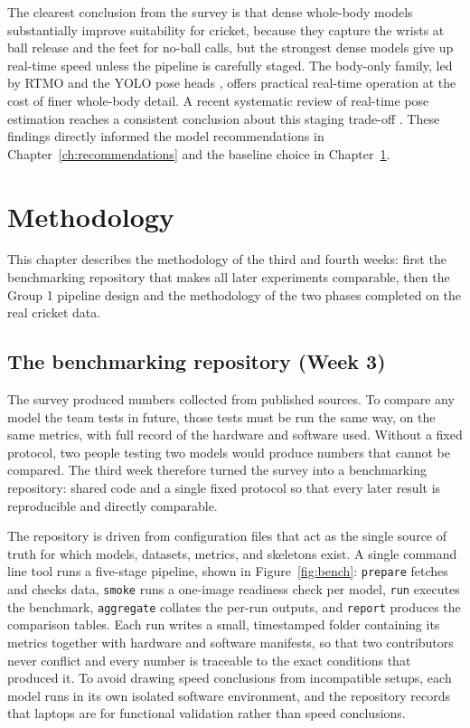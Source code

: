 \documentclass[oneside,openany]{book}
\begin{document}
The clearest conclusion from the survey is that dense whole-body models substantially improve
suitability for cricket, because they capture the wrists at ball release and the feet for
no-ball calls, but the strongest dense models give up real-time speed unless the pipeline is
carefully staged. The body-only family, led by RTMO and the YOLO pose heads
\cite{maji2022yolopose}, offers practical real-time operation at the cost of finer whole-body
detail. A recent systematic review of
real-time pose estimation reaches a consistent conclusion about this staging trade-off
\cite{posereview2025}. These findings directly informed the model recommendations in
Chapter~\ref{ch:recommendations} and the baseline choice in Chapter~\ref{ch:methodology}.

\chapter{Methodology}
\label{ch:methodology}
This chapter describes the methodology of the third and fourth weeks: first the benchmarking
repository that makes all later experiments comparable, then the Group 1 pipeline design and the
methodology of the two phases completed on the real cricket data.

\section{The benchmarking repository (Week 3)}
The survey produced numbers collected from published sources. To compare any model the team
tests in future, those tests must be run the same way, on the same metrics, with full record of
the hardware and software used. Without a fixed protocol, two people testing two models would
produce numbers that cannot be compared. The third week therefore turned the survey into a
benchmarking repository: shared code and a single fixed protocol so that every later result is
reproducible and directly comparable.

The repository is driven from configuration files that act as the single source of truth for
which models, datasets, metrics, and skeletons exist. A single command line tool runs a
five-stage pipeline, shown in Figure~\ref{fig:bench}: \texttt{prepare} fetches and checks data,
\texttt{smoke} runs a one-image readiness check per model, \texttt{run} executes the benchmark,
\texttt{aggregate} collates the per-run outputs, and \texttt{report} produces the comparison
tables. Each run writes a small, timestamped folder containing its metrics together with
hardware and software manifests, so that two contributors never conflict and every number is
traceable to the exact conditions that produced it. To avoid drawing speed conclusions from
incompatible setups, each model runs in its own isolated software environment, and the
repository records that laptops are for functional validation rather than speed conclusions.
\end{document}

